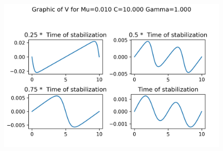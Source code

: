 \begin{figure}[H]
	\includegraphics[scale=0.5]{../graphs_data_nonsmooth_1/slices/Graph_V_mu0.010_C10.000_gamma1.000.png}
\end{figure}

